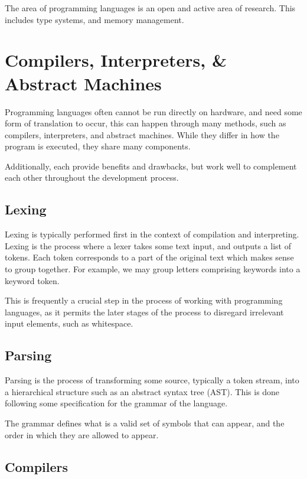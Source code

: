 The area of programming languages is an open and active area of research. This includes type systems, and memory management.

\section{Compilers, Interpreters, \& Abstract Machines}

Programming languages often cannot be run directly on hardware, and need some form of translation to occur, this can happen through many methods, such as compilers, interpreters, and abstract machines.
While they differ in how the program is executed, they share many components.

Additionally, each provide benefits and drawbacks, but work well to complement each other throughout the development process.

\subsection{Lexing}

Lexing is typically performed first in the context of compilation and interpreting\cite{CompilerConstruction, DragonBook}. Lexing is the process where a lexer takes some text input, and outputs a list of tokens. Each token corresponds to a part of the original text which makes sense to group together. For example, we may group letters comprising keywords into a keyword token. 

This is frequently a crucial step in the process of working with programming languages, as it permits the later stages of the process to disregard irrelevant input elements, such as whitespace.

\subsection{Parsing}

Parsing is the process of transforming some source, typically a token stream, into a hierarchical structure such as an abstract syntax tree (AST)\cite{CompilerConstruction, DragonBook}. This is done following some specification for the grammar of the language.

The grammar defines what is a valid set of symbols that can appear, and the order in which they are allowed to appear.


\subsection{Compilers}

